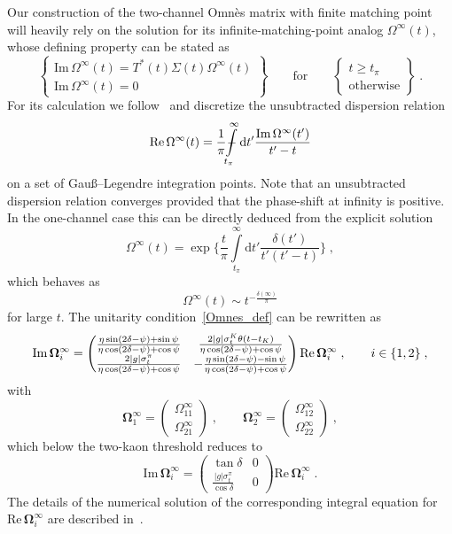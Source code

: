\documentclass[11pt]{article}%
\def\Xint#1{\mathchoice
   {\XXint\displaystyle\textstyle{#1}}%
   {\XXint\textstyle\scriptstyle{#1}}%
   {\XXint\scriptstyle\scriptscriptstyle{#1}}%
   {\XXint\scriptscriptstyle\scriptscriptstyle{#1}}%
   \!\int}
\def\XXint#1#2#3{{\setbox0=\hbox{$#1{#2#3}{\int}$}
     \vcenter{\hbox{$#2#3$}}\kern-0.5\wd0}}
\providecommand{\dashint}[1][0pt]{\Xint{\hspace{#1}-}}%
\providecommand{\ec}{\;,}
\providecommand{\ep}{\;.}
\newcommand{\diff}{\text{d}}
\newcommand{\mpi}{M_{\pi}}
\newcommand{\tpi}{t_\pi}
\newcommand{\tK}{t_K}
\newcommand{\beq}{\begin{equation}}
\newcommand{\eeq}{\end{equation}}
\renewcommand{\Im}{\text{Im}\,}
\renewcommand{\Re}{\text{Re}\,}
\begin{document}
Our construction of the two-channel Omn\`es matrix with finite matching point will heavily rely on the solution for its infinite-matching-point analog
 $\Omega^\infty(t)$, whose defining property can be stated as
\beq
\label{Omnes_def}
\begin{Bmatrix}\Im \Omega^\infty(t)=T^*(t)\Sigma(t)\Omega^\infty(t) \\ \Im \Omega^\infty(t)=0\end{Bmatrix}
\qquad \text{for} \qquad
\begin{Bmatrix}t\geq \tpi \\ \text{otherwise}\end{Bmatrix}\ep
\eeq
For its calculation we follow~\cite{Moussallam99} and discretize the unsubtracted dispersion relation
\beq
\Re \Omega^\infty(t)=\frac{1}{\pi}\dashint[0.5pt]\limits_{\tpi}^{\infty}\diff t'\frac{\Im \Omega^\infty(t')}{t'-t}
\eeq
on a set of Gau\ss--Legendre integration points. Note that an unsubtracted dispersion relation converges provided that the phase-shift at infinity is positive. In the one-channel case this can be directly deduced from the explicit solution
\beq
\label{sol_single_infinite}
\Omega^\infty(t)=\exp\Bigg\{\frac{t}{\pi}\int\limits_{\tpi}^\infty\diff t'\frac{\delta(t')}{t'(t'-t)}\Bigg\}\ec
\eeq
which behaves as 
\beq
\Omega^\infty(t)\sim t^{-\frac{\delta(\infty)}{\pi}}
\eeq
for large $t$. 
The unitarity condition~\eqref{Omnes_def} can be rewritten as
\beq
\label{unitarity}
\renewcommand{\arraystretch}{1.3}
\Im\mathbf{\Omega}^\infty_i=\begin{pmatrix}
                    \frac{\eta\sin(2\delta-\psi)+\sin\psi}{\eta\cos(2\delta-\psi)+\cos\psi} & \frac{2|g|\sigma_t^K\theta(t-\tK)}{\eta\cos(2\delta-\psi)+\cos\psi}\\
\frac{2|g|\sigma_t^\pi}{\eta\cos(2\delta-\psi)+\cos\psi} & -\frac{\eta \sin(2\delta-\psi)-\sin\psi}{\eta\cos(2\delta-\psi)+\cos\psi}
                   \end{pmatrix}
\Re\mathbf{\Omega}^\infty_i\ec\qquad i\in\{1,2\}\ec
\eeq
with
\beq
\label{Omnes_vector}
\mathbf{\Omega}_1^\infty=\begin{pmatrix}
                                          \Omega^\infty_{11}\\ \Omega^\infty_{21}
                                         \end{pmatrix}\ec \qquad
\mathbf{\Omega}_2^\infty=\begin{pmatrix}
                                          \Omega^\infty_{12}\\ \Omega^\infty_{22}
                                         \end{pmatrix}\ec
\eeq
which below the two-kaon threshold reduces to
\beq
\label{Omnes_below_tK}
\Im\mathbf{\Omega}^\infty_i=\begin{pmatrix}
                    \tan\delta & 0\\
\frac{|g|\sigma_t^\pi}{\cos\delta} & 0
                   \end{pmatrix}
\Re\mathbf{\Omega}^\infty_i\ep
\eeq
The details of the numerical solution of the corresponding integral equation for $\Re\mathbf{\Omega}^\infty_i$ are described in~\cite{Moussallam99,SDG_diss}.
\end{document}
